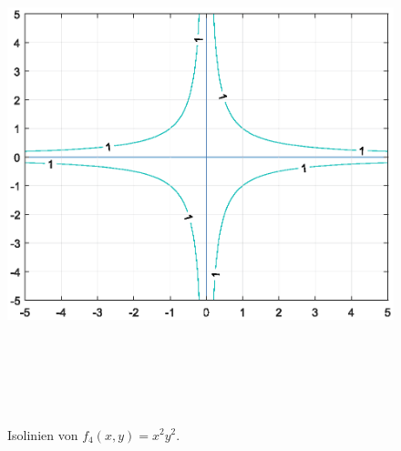 {\begin{figure}[ht]
\begin{center}
\includegraphics[width=15cm, height=15cm]{../A/analysis/isolines_and_isosurfaces_001_aiv.eps}
\caption{Isolinien von $f_4(x,y) = x^2y^2$.}
\label{f_4}
\end{center}
\end{figure}


}
